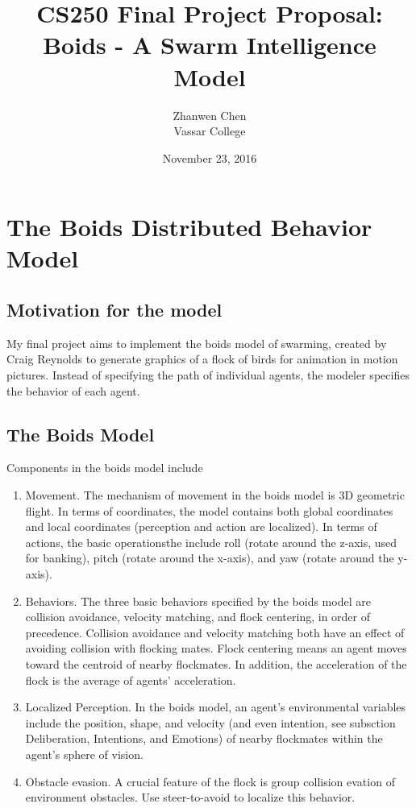 \documentclass{article}
\begin{document}
\title{CS250 Final Project Proposal: Boids - A Swarm Intelligence Model}
\date{November 23, 2016}
\author{Zhanwen Chen\\Vassar College}
\maketitle

\section{The Boids Distributed Behavior Model}

\subsection{Motivation for the model}

My final project aims to implement the boids model of swarming, created by
Craig Reynolds to generate graphics of a flock of birds for animation
in motion pictures. Instead of specifying the path of individual agents, the
modeler specifies the behavior of each agent.

\subsection{The Boids Model}

Components in the boids model include

{\begin{enumerate}
  \item [] Movement. The mechanism of movement in the boids model is 3D geometric flight.
  In terms of coordinates, the model contains both global coordinates and local
  coordinates (perception and action are localized). In terms of actions, the
  basic operationsthe include roll (rotate around the z-axis, used for banking),
  pitch (rotate around the x-axis), and yaw (rotate around the y-axis).
  \item [] Behaviors. The three basic behaviors specified by the boids model are collision
  avoidance, velocity matching, and flock centering, in order of precedence.
  Collision avoidance and velocity matching both have an effect of avoiding
  collision with flocking mates. Flock centering means an agent moves toward the
  centroid of nearby flockmates. In addition, the acceleration of the flock is the
  average of agents' acceleration.
  \item [] Localized Perception. In the boids model, an agent's environmental variables
  include the position, shape, and velocity (and even intention, see subsction
  Deliberation, Intentions, and Emotions) of nearby flockmates within the agent's
  sphere of vision.
  \item [] Obstacle evasion. A crucial feature of the flock is group collision evation
  of environment obstacles. Use steer-to-avoid to localize this behavior.
\end{enumerate}}
\end{document}
